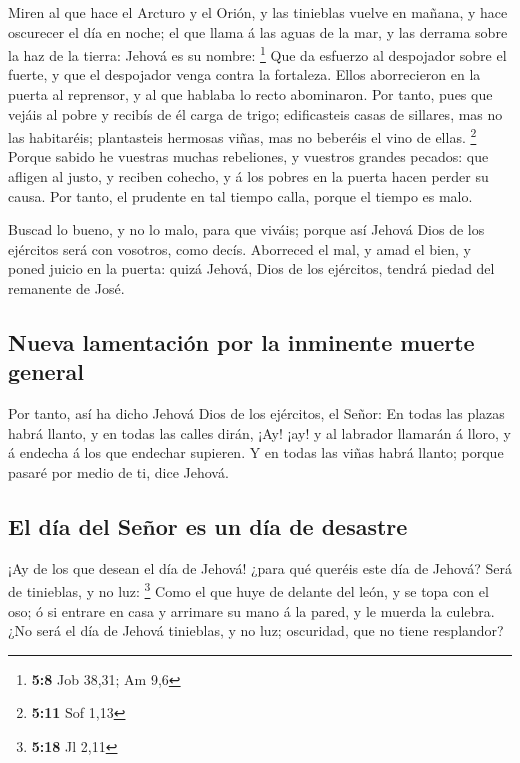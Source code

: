  Miren al que hace el Arcturo y el Orión, y las tinieblas
vuelve en mañana, y hace oscurecer el día en noche; el que llama á las
aguas de la mar, y las derrama sobre la haz de la tierra: Jehová es su
nombre: \footnote{\textbf{5:8} Job 38,31; Am 9,6}  Que da
esfuerzo al despojador sobre el fuerte, y que el despojador venga contra
la fortaleza.  Ellos aborrecieron en la puerta al
reprensor, y al que hablaba lo recto abominaron.  Por
tanto, pues que vejáis al pobre y recibís de él carga de trigo;
edificasteis casas de sillares, mas no las habitaréis; plantasteis
hermosas viñas, mas no beberéis el vino de ellas. \footnote{\textbf{5:11}
  Sof 1,13}  Porque sabido he vuestras muchas rebeliones,
y vuestros grandes pecados: que afligen al justo, y reciben cohecho, y á
los pobres en la puerta hacen perder su causa.  Por
tanto, el prudente en tal tiempo calla, porque el tiempo es malo.

 Buscad lo bueno, y no lo malo, para que viváis; porque
así Jehová Dios de los ejércitos será con vosotros, como decís.
 Aborreced el mal, y amad el bien, y poned juicio en la
puerta: quizá Jehová, Dios de los ejércitos, tendrá piedad del remanente
de José.

\hypertarget{nueva-lamentaciuxf3n-por-la-inminente-muerte-general}{%
\subsection{Nueva lamentación por la inminente muerte
general}\label{nueva-lamentaciuxf3n-por-la-inminente-muerte-general}}

 Por tanto, así ha dicho Jehová Dios de los ejércitos, el
Señor: En todas las plazas habrá llanto, y en todas las calles dirán,
¡Ay! ¡ay! y al labrador llamarán á lloro, y á endecha á los que endechar
supieren.  Y en todas las viñas habrá llanto; porque
pasaré por medio de ti, dice Jehová.

\hypertarget{el-duxeda-del-seuxf1or-es-un-duxeda-de-desastre}{%
\subsection{El día del Señor es un día de
desastre}\label{el-duxeda-del-seuxf1or-es-un-duxeda-de-desastre}}

 ¡Ay de los que desean el día de Jehová! ¿para qué
queréis este día de Jehová? Será de tinieblas, y no luz: \footnote{\textbf{5:18}
  Jl 2,11}  Como el que huye de delante del león, y se
topa con el oso; ó si entrare en casa y arrimare su mano á la pared, y
le muerda la culebra.  ¿No será el día de Jehová
tinieblas, y no luz; oscuridad, que no tiene resplandor?

